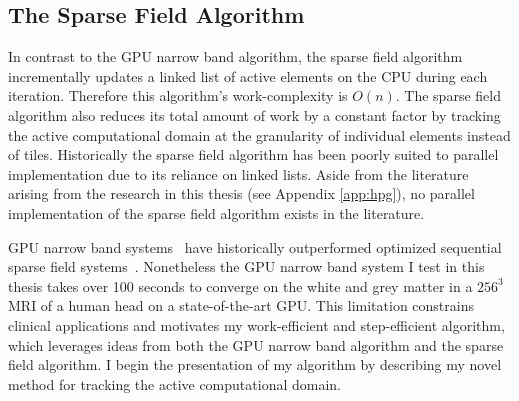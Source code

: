 \subsection{The Sparse Field Algorithm}

In contrast to the GPU narrow band algorithm, the sparse field algorithm~\cite{Whitaker-1998,Peng-1999} incrementally updates a linked list of active elements on the CPU during each iteration. Therefore this algorithm's work-complexity is $O(n)$. The sparse field algorithm also reduces its total amount of work by a constant factor by tracking the active computational domain at the granularity of individual elements instead of tiles. Historically the sparse field algorithm has been poorly suited to parallel implementation due to its reliance on linked lists. Aside from the literature arising from the research in this thesis (see Appendix \ref{app:hpg}), no parallel implementation of the sparse field algorithm exists in the literature.

GPU narrow band systems~\cite{Lefohn-2003-MICCAI,Lefohn-2003-Vis,Cates-2004,Lefohn-2004,Jeong-2009} have historically outperformed optimized sequential sparse field systems~\cite{Ibanez-2005}. Nonetheless the GPU narrow band system I test in this thesis takes over 100 seconds to converge on the white and grey matter in a ${256}^3$ MRI of a human head on a state-of-the-art GPU. This limitation constrains clinical applications and motivates my work-efficient and step-efficient algorithm, which leverages ideas from both the GPU narrow band algorithm and the sparse field algorithm. I begin the presentation of my algorithm by describing my novel method for tracking the active computational domain.

